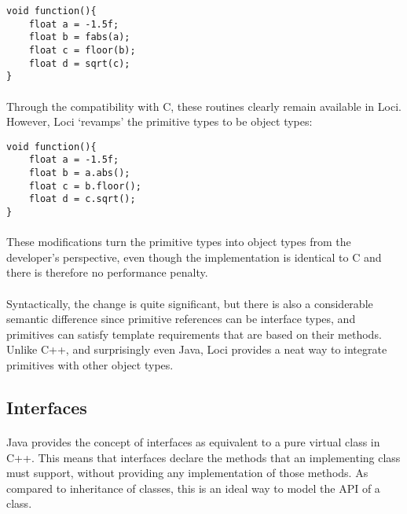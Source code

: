 \documentclass[12pt,twoside,notitlepage]{report}
\begin{document}
\begin{lstlisting}
void function(){
	float a = -1.5f;
	float b = fabs(a);
	float c = floor(b);
	float d = sqrt(c);
}
\end{lstlisting}


\paragraph{}
Through the compatibility with C, these routines clearly remain available in Loci. However, Loci `revamps' the primitive types to be object types:


\begin{lstlisting}
void function(){
	float a = -1.5f;
	float b = a.abs();
	float c = b.floor();
	float d = c.sqrt();
}
\end{lstlisting}


\paragraph{}
These modifications turn the primitive types into object types from the developer's perspective, even though the implementation is identical to C and there is therefore no performance penalty.

\paragraph{}
Syntactically, the change is quite significant, but there is also a considerable semantic difference since primitive references can be interface types, and primitives can satisfy template requirements that are based on their methods. Unlike C++, and surprisingly even Java, Loci provides a neat way to integrate primitives with other object types.

\clearpage

\subsection{Interfaces}

\paragraph{}
Java provides the concept of interfaces as equivalent to a pure virtual class in C++. This means that interfaces declare the methods that an implementing class must support, without providing any implementation of those methods. As compared to inheritance of classes, this is an ideal way to model the API of a class.
\end{document}
